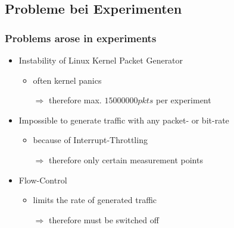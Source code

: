 \documentclass{beamer}
\begin{document}
\subsection*{Probleme bei Experimenten}
\begin{frame}
\frametitle{Problems arose in experiments }
\begin{itemize}
	\item Instability of  Linux Kernel Packet Generator
		\begin{itemize}
			\item often kernel panics
			\item [$\Rightarrow$] therefore max. $15000000 pkts$ per experiment\newline
		\end{itemize}
	\item Impossible to generate traffic with any packet- or bit-rate
		\begin{itemize}
			\item because of Interrupt-Throttling
			\item [$\Rightarrow$] therefore only certain measurement points \newline
		\end{itemize}
	\item Flow-Control
		\begin{itemize}
			\item limits the rate of generated traffic
			\item [$\Rightarrow$] therefore must be switched off
		\end{itemize}
\end{itemize}
\end{frame}
\end{document}
